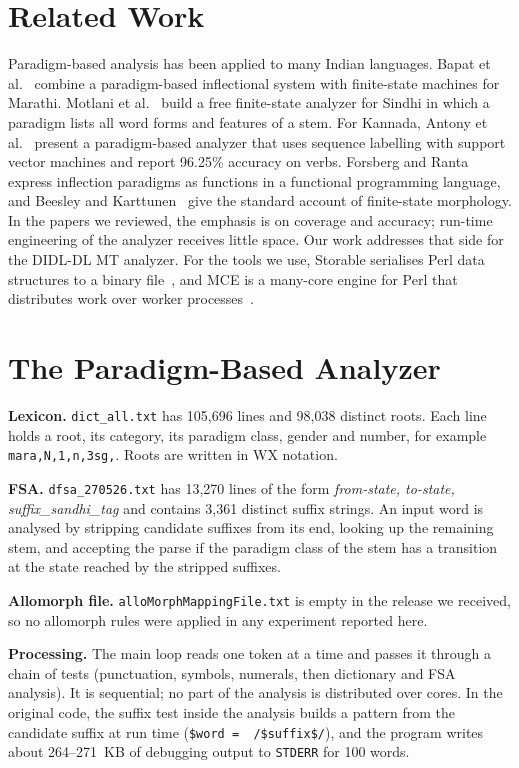 \documentclass[conference]{IEEEtran}
\begin{document}
\section{Related Work}
Paradigm-based analysis has been applied to many Indian languages. Bapat et al.~\cite{bapat2010} combine a paradigm-based inflectional system with finite-state machines for Marathi. Motlani et al.~\cite{motlani2016} build a free finite-state analyzer for Sindhi in which a paradigm lists all word forms and features of a stem. For Kannada, Antony et al.~\cite{antony2010} present a paradigm-based analyzer that uses sequence labelling with support vector machines and report 96.25\% accuracy on verbs. Forsberg and Ranta~\cite{forsberg2004} express inflection paradigms as functions in a functional programming language, and Beesley and Karttunen~\cite{beesley2003} give the standard account of finite-state morphology. In the papers we reviewed, the emphasis is on coverage and accuracy; run-time engineering of the analyzer receives little space. Our work addresses that side for the DIDL-DL MT analyzer. For the tools we use, Storable serialises Perl data structures to a binary file~\cite{storable}, and MCE is a many-core engine for Perl that distributes work over worker processes~\cite{mce}.

\section{The Paradigm-Based Analyzer}
\textbf{Lexicon.} \texttt{dict\_all.txt} has 105,696 lines and 98,038 distinct roots. Each line holds a root, its category, its paradigm class, gender and number, for example \texttt{mara,N,1,n,3sg,}. Roots are written in WX notation.

\textbf{FSA.} \texttt{dfsa\_270526.txt} has 13,270 lines of the form \emph{from-state, to-state, suffix\_sandhi\_tag} and contains 3,361 distinct suffix strings. An input word is analysed by stripping candidate suffixes from its end, looking up the remaining stem, and accepting the parse if the paradigm class of the stem has a transition at the state reached by the stripped suffixes.

\textbf{Allomorph file.} \texttt{alloMorphMappingFile.txt} is empty in the release we received, so no allomorph rules were applied in any experiment reported here.

\textbf{Processing.} The main loop reads one token at a time and passes it through a chain of tests (punctuation, symbols, numerals, then dictionary and FSA analysis). It is sequential; no part of the analysis is distributed over cores. In the original code, the suffix test inside the analysis builds a pattern from the candidate suffix at run time (\texttt{\$word =~ /\$suffix\$/}), and the program writes about 264--271~KB of debugging output to \texttt{STDERR} for 100 words.
\end{document}
